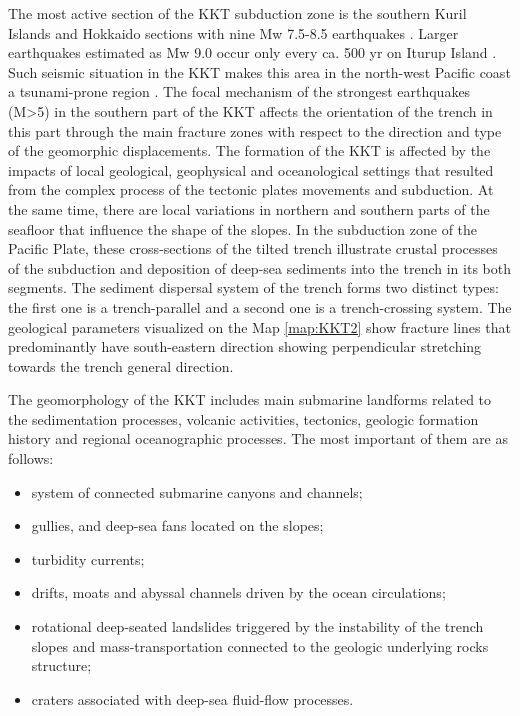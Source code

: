 \documentclass[11pt,a4paper]{report}
\begin{document}
The most active section of the \ac{KKT} subduction zone is the southern Kuril Islands and Hokkaido sections with nine Mw 7.5-8.5 earthquakes \cite{MacInnes}. Larger earthquakes estimated as Mw 9.0 occur only every ca. 500 yr on Iturup Island \cite{Iliev}. Such seismic situation in the \ac{KKT} makes this area in the north-west Pacific coast a tsunami-prone region \cite{Gusiakov2016}. The focal mechanism of the strongest earthquakes (M>5) in the southern part of the \ac{KKT} affects the orientation of the trench in this part through the main fracture zones with respect to the direction and type of the geomorphic displacements. The formation of the \ac{KKT} is affected by the impacts of local geological, geophysical and oceanological settings that resulted from the complex process of the tectonic plates movements and subduction. At the same time, there are local variations in northern and southern parts of the seafloor that influence the shape of the slopes. In the subduction zone of the Pacific Plate, these cross-sections of the tilted trench illustrate crustal processes of the subduction and deposition of deep-sea sediments into the trench in its both segments. The sediment dispersal system of the trench forms two distinct types: the first one is a trench-parallel and a second one is a trench-crossing system. The geological parameters visualized on the Map \ref{map:KKT2} show fracture lines that predominantly have south-eastern direction showing perpendicular stretching towards the trench general direction.

The geomorphology of the \ac{KKT} includes main submarine landforms related to the sedimentation processes, volcanic activities, tectonics, geologic formation history and regional oceanographic processes. The most important of them are as follows: 

\begin{itemize}
	\item system of connected submarine canyons and channels; 
	\item gullies, and deep-sea fans located on the slopes; 
	\item turbidity currents; 
	\item drifts, moats and abyssal channels driven by the ocean circulations; 
	\item rotational deep-seated landslides triggered by the instability of the trench slopes and mass-transportation connected to the geologic underlying rocks structure; 
	\item craters associated with deep-sea fluid-flow processes.
\end{itemize}
\end{document}
